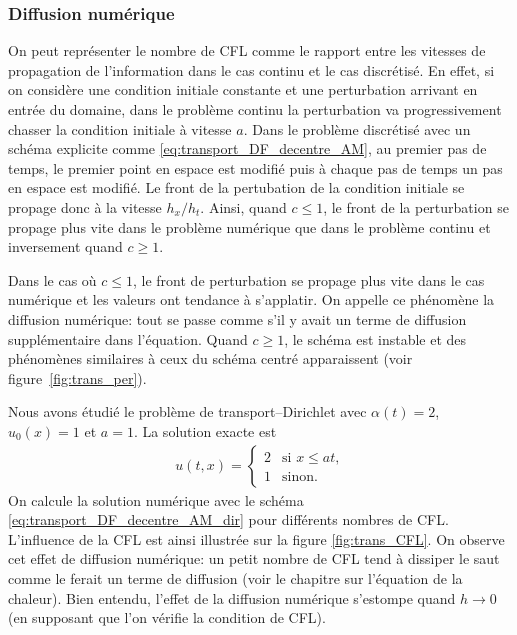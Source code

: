 \documentclass[12pt,a4paper,twoside]{article}
\begin{document}
\subsubsection{Diffusion num\'erique}



On peut repr\'esenter le nombre de CFL comme le rapport entre les vitesses
de propagation de l'information dans le cas continu et le cas discr\'etis\'e.
En effet, si on consid\`ere une condition initiale constante et une perturbation
arrivant en entr\'ee du domaine, dans le probl\`eme continu la perturbation
va progressivement chasser la condition initiale \`a vitesse $a$.
Dans le probl\`eme discr\'etis\'e avec un sch\'ema explicite 
comme \eqref{eq:transport_DF_decentre_AM}, au premier pas de temps, 
le premier point en espace est modifi\'e puis
\`a chaque pas de temps un pas en espace est modifi\'e.
Le front de la pertubation de la condition initiale se propage donc \`a la vitesse
$h_x / h_t$.
Ainsi, quand $c \leq 1$, le front de la perturbation se propage plus vite dans le probl\`eme
num\'erique que dans le probl\`eme continu et inversement quand $c \geq 1$.


Dans le cas o\`u $c \leq 1$, le front de perturbation se propage plus vite 
dans le cas num\'erique et les valeurs ont tendance \`a s'applatir.
On appelle ce ph\'enom\`ene la diffusion num\'erique:
tout se passe comme s'il y avait un terme de diffusion suppl\'ementaire dans l'\'equation.
Quand $c \geq 1$, le sch\'ema est instable et des ph\'enom\`enes similaires \`a ceux 
du sch\'ema centr\'e apparaissent (voir figure~\ref{fig:trans_per}).



Nous avons \'etudi\'e le probl\`eme de transport--Dirichlet
avec $\alpha(t) = 2$, $u_0(x) = 1$ et $a = 1$.
La solution exacte est 
\begin{align*}
  u(t,x) = 
  \begin{cases}
    2 & \text{si $x \leq at$,}
    \\
    1 & \text{sinon.}
  \end{cases}
\end{align*}
On calcule la solution num\'erique avec le sch\'ema \eqref{eq:transport_DF_decentre_AM_dir}
pour diff\'erents nombres de CFL.
L'influence de la CFL est ainsi illustr\'ee sur la figure \ref{fig:trans_CFL}.
On observe cet effet de diffusion num\'erique: un petit nombre de CFL tend \`a dissiper le saut
comme le ferait un terme de diffusion (voir le chapitre sur l'\'equation de la chaleur).
Bien entendu, l'effet de la diffusion num\'erique s'estompe quand $h \to 0$
(en supposant que l'on v\'erifie la condition de CFL).
\end{document}

